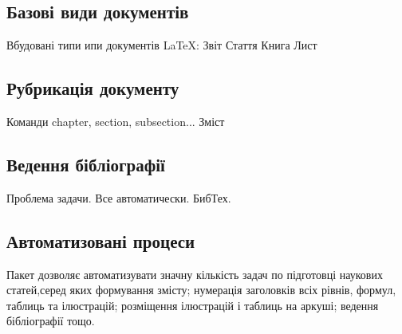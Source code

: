\subsection{Базові види документів}

Вбудовані типи ипи документів LaTeX:
Звіт
Стаття
Книга
Лист

\subsection{Рубрикація документу}

Команди chapter, section, subsection...
Зміст

\subsection{Ведення бібліографії}
Проблема задачи.
Все автоматически.
БибТех.

\subsection{Автоматизовані процеси}

Пакет   дозволяє   автоматизувати   значну   кількість  задач  по  підготовці наукових статей,серед яких формування змісту; нумерація заголовків всіх рівнів, формул,  таблиць  та  ілюстрацій;  розміщення  ілюстрацій  і  таблиць  на  аркуші; ведення бібліографії тощо.
